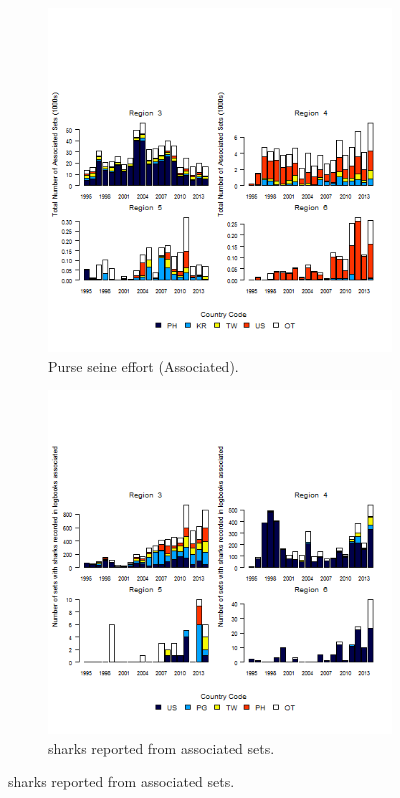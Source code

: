 \documentclass[12pt]{SCreport}
\begin{document}
\begin{landscape}
\begin{figure}
\centering
   \begin{subfigure}[b]{0.49\textwidth}
       \includegraphics[width=\textwidth]{../GRAPHICS/Defined/FIG_08a_ps_total_effAssociated}
       \caption{Purse seine effort (Associated).}
       \label{fig:fig08a}
   \end{subfigure}
   \begin{subfigure}[b]{0.49\textwidth}
       \includegraphics[width=\textwidth]{../GRAPHICS/Defined/FIG_08b_ps_oper_shks_rep_cntry_associated}
       \caption{sharks reported from associated sets.}
       \label{fig:fig08b}
   \end{subfigure}


\end{figure}
\end{landscape}
\end{document}
